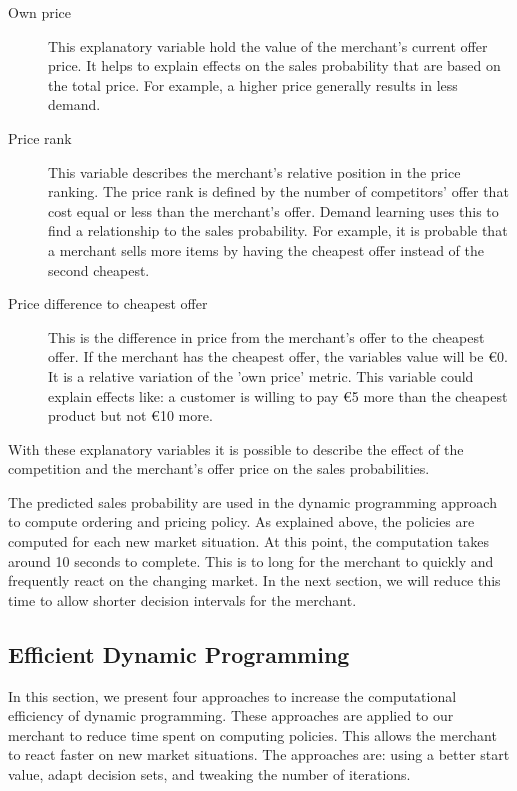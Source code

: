 \begin{description}
	\item [Own price]
		This explanatory variable hold the value of the merchant's current offer price.
		It helps to explain effects on the sales probability that are based on the total price.
		For example, a higher price generally results in less demand.
	\item [Price rank]
		This variable describes the merchant's relative position in the price ranking.
		The price rank is defined by the number of competitors' offer that cost equal or less than the merchant's offer.
		Demand learning uses this to find a relationship to the sales probability.
		For example, it is probable that a merchant sells more items by having the cheapest offer instead of the second cheapest.
	\item [Price difference to cheapest offer]
		This is the difference in price from the merchant's offer to the cheapest offer.
		If the merchant has the cheapest offer, the variables value will be €0.
		It is a relative variation of the 'own price' metric.
		This variable could explain effects like: a customer is willing to pay €5 more than the cheapest product but not €10 more.
\end{description}

With these explanatory variables it is possible to describe the effect of the competition and the merchant's offer price on the sales probabilities.

The predicted sales probability are used in the dynamic programming approach to compute ordering and pricing policy.
As explained above, the policies are computed for each new market situation.
At this point, the computation takes around 10 seconds to complete.
This is to long for the merchant to quickly and frequently react on the changing market.
In the next section, we will reduce this time to allow shorter decision intervals for the merchant.


\subsection{Efficient Dynamic Programming}
\label{section:faster_dyn_prog}
In this section, we present four approaches to increase the computational efficiency of dynamic programming.
These approaches are applied to our merchant to reduce time spent on computing policies.
This allows the merchant to react faster on new market situations.
The approaches are: using a better start value, adapt decision sets, and tweaking the number of iterations.

